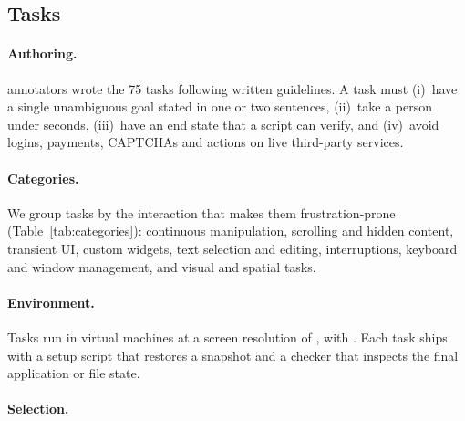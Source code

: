 \subsection{Tasks}
\label{sec:tasks}



\paragraph{Authoring.}  annotators wrote the 75 tasks following written guidelines. A task must (i)~have a single unambiguous goal stated in one or two sentences, (ii)~take a person under  seconds, (iii)~have an end state that a script can verify, and (iv)~avoid logins, payments, CAPTCHAs and actions on live third-party services. 

\paragraph{Categories.} We group tasks by the interaction that makes them frustration-prone (Table~\ref{tab:categories}): continuous manipulation, scrolling and hidden content, transient UI, custom widgets, text selection and editing, interruptions, keyboard and window management, and visual and spatial tasks. 

\paragraph{Environment.} Tasks run in  virtual machines at a screen resolution of , with . Each task ships with a setup script that restores a snapshot and a checker that inspects the final application or file state. 

\paragraph{Selection.} 

